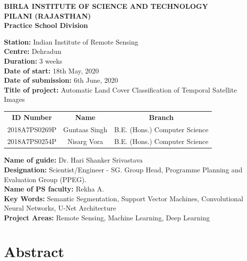 \documentclass[12pt, a4paper]{report}
\begin{document}
\begin{center}  
\textbf {BIRLA INSTITUTE OF SCIENCE AND TECHNOLOGY\\
PILANI (RAJASTHAN)\\
Practice School Division}
\end{center}
\begin{onehalfspace}
\textbf{Station:} Indian Institute of Remote Sensing \\
\textbf{Centre:} Dehradun\\
\textbf{Duration:} 3 weeks\\
\textbf{Date of start:} 18th May, 2020 \\
\textbf{Date of submission:} 6th June, 2020 \\
\textbf{Title of project:} Automatic Land Cover Classification of Temporal Satellite Images
\begin{center}
\begin{tabular}{c c c}
\textbf{ID Number} & \textbf{Name} & \textbf{Branch} \\
2018A7PS0269P & Guntaas Singh & B.E. (Hons.) Computer Science \\
2018A7PS0254P & Nisarg Vora  & B.E. (Hons.) Computer Science \\
\end{tabular} 
\end{center}
\textbf{Name of guide:} Dr. Hari Shanker Srivastava \\
\textbf{Designation:} Scientist/Engineer - SG. Group Head, Programme Planning and Evaluation Group (PPEG). \\
\textbf{Name of PS faculty:} Rekha A. \\
\textbf{Key Words:} Semantic Segmentation, Support Vector Machines, Convolutional Neural Networks, U-Net Architecture\\
\textbf{Project Areas:} Remote Sensing, Machine Learning, Deep Learning
\section{Abstract}

\end{onehalfspace}
\end{document}
